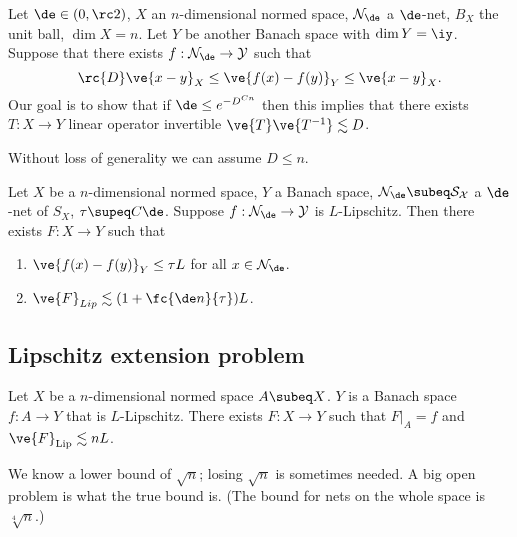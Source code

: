 

Let $\de\in (0,\rc2)$, $X$ an $n$-dimensional normed space, $\cal N_\de$ a $\de$-net, $B_X$ the unit ball, $\dim X=n$. Let $Y$ be another Banach space with $\dim Y=\iy$. Suppose that there exists $f:\cal N_\de\to Y$ such that 
\[
\rc{D} \ve{x-y}_X\le \ve{f(x)-f(y)}_Y \le \ve{x-y}_X.
\]
Our goal is to show that if $\de\le e^{-D^{Cn}}$ then this implies that there exists $T:X\to Y$ linear operator invertible $\ve{T}\ve{T^{-1}}\lesssim D$. 

Without loss of generality we can assume $D\le n$. 
\begin{thm} Let $X$ be a $n$-dimensional normed space, $Y$ a Banach space, $\cal N_\de\subeq S_X$ a $\de$-net of $S_X$, $\tau\supeq C\de$. Suppose $f:\cal N_\de\to Y$ is $L$-Lipschitz. Then there exists $F:X\to Y$ such that 
\begin{enumerate}
\item $\ve{f(x)-f(y)}_Y\le \tau L$ for all $x\in \cal N_\de$. 
\item $\ve{F}_{Lip} \lesssim (1+\fc{\de n}{\tau}) L$.
\end{enumerate}
\end{thm}
\subsection{Lipschitz extension problem}

\begin{thm}
Let $X$ be a $n$-dimensional normed space $A\subeq X$. $Y$ is a Banach space $f:A\to Y$ that is $L$-Lipschitz. There exists $F:X\to Y$ such that $F|_A=f$ and $\ve{F}_{\text{Lip}}\lesssim nL$.
\end{thm}
We know a lower bound of $\sqrt n$; losing $\sqrt n$ is sometimes needed. A big open problem is what the true bound is. (The bound for nets on the whole space is $\sqrt[4]{n}$.)

